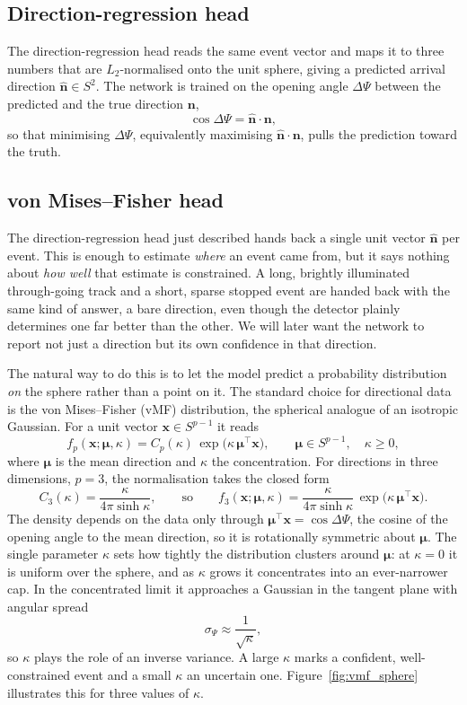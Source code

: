 \subsection{Direction-regression head}

The direction-regression head reads the same event vector and maps it to three numbers that are $L_2$-normalised onto the unit sphere, giving a predicted arrival direction $\hat{\mathbf{n}}\in S^2$. The network is trained on the opening angle $\Delta\Psi$ between the predicted and the true direction $\mathbf{n}$,
\[
    \cos\Delta\Psi = \hat{\mathbf{n}}\cdot\mathbf{n},
\]
so that minimising $\Delta\Psi$, equivalently maximising $\hat{\mathbf{n}}\cdot\mathbf{n}$, pulls the prediction toward the truth.

\subsection{von Mises--Fisher head}
\label{sec:vmf_method}

The direction-regression head just described hands back a single unit vector
$\hat{\mathbf{n}}$ per event. This is enough to estimate \emph{where} an event
came from, but it says nothing about \emph{how well} that estimate is
constrained. A long, brightly illuminated
through-going track and a short, sparse stopped event are handed back with the
same kind of answer, a bare direction, even though the detector plainly
determines one far better than the other. We will later want the network to
report not just a direction but its own confidence in that direction.

The natural way to do this is to let the model predict a probability
distribution \emph{on} the sphere rather than a point on it. The standard choice
for directional data is the von Mises--Fisher (vMF) distribution, the spherical
analogue of an isotropic Gaussian.
For a unit vector $\mathbf{x}\in S^{p-1}$ it reads
\[
    f_p(\mathbf{x};\boldsymbol\mu,\kappa)
    = C_p(\kappa)\,\exp\!\bigl(\kappa\,\boldsymbol\mu^\top\mathbf{x}\bigr),
    \qquad
    \boldsymbol\mu\in S^{p-1},\quad \kappa\ge 0,
\]
where $\boldsymbol\mu$ is the mean direction and $\kappa$ the concentration. For
directions in three dimensions, $p=3$, the normalisation takes the closed form
\[
    C_3(\kappa) = \frac{\kappa}{4\pi\sinh\kappa},
    \qquad\text{so}\qquad
    f_3(\mathbf{x};\boldsymbol\mu,\kappa)
    = \frac{\kappa}{4\pi\sinh\kappa}\,
      \exp\!\bigl(\kappa\,\boldsymbol\mu^\top\mathbf{x}\bigr).
\]
The density depends on the data only through
$\boldsymbol\mu^\top\mathbf{x}=\cos\Delta\Psi$, the cosine of the opening angle
to the mean direction, so it is rotationally symmetric about $\boldsymbol\mu$.
The single parameter $\kappa$ sets how tightly the distribution clusters around
$\boldsymbol\mu$: at $\kappa=0$ it is uniform over the sphere, and as $\kappa$
grows it concentrates into an ever-narrower cap. In the concentrated limit it
approaches a Gaussian in the tangent plane with angular spread
\[
    \sigma_\Psi \approx \frac{1}{\sqrt{\kappa}},
\]
so $\kappa$ plays the role of an inverse variance. A large $\kappa$ marks a
confident, well-constrained event and a small $\kappa$ an uncertain one.
Figure~\ref{fig:vmf_sphere} illustrates this for three values of $\kappa$.

